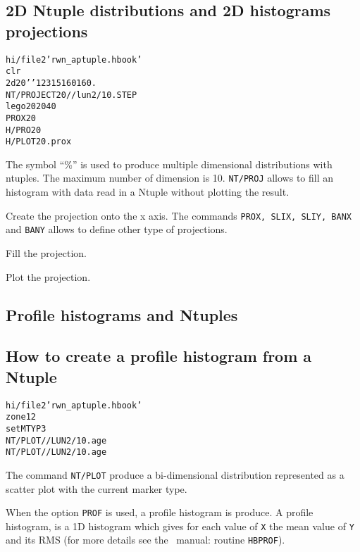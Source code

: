 \clearpage

\subsection{2D Ntuple distributions and 2D histograms projections}

\begin{alltt}
      hi/file 2 'rwn_aptuple.hbook'
      clr
      2d 20 ' ' 12 3 15 16 0 16 0.
     NT/PROJECT 20 //lun2/10.STEP%GRADE
      lego 20 20 40
     PROX 20
     H/PRO 20
     H/PLOT 20.prox
\end{alltt} 
\begin{DinglistE}
\item The symbol ``\%'' is used to produce multiple dimensional distributions
      with ntuples. The maximum number of dimension is 10. {\tt NT/PROJ} allows
      to fill an histogram with data read in a Ntuple without plotting the
      result.
\item Create the projection onto the x axis. The commands {\tt PROX, SLIX,
      SLIY, BANX} and {\tt BANY} allows to define other type of projections.
\item Fill the projection. 
\item Plot the projection. 
\end{DinglistE}

\clearpage

\subsection{Profile histograms and Ntuples}
\subsection*{How to create a profile histogram from a Ntuple}
\begin{alltt}
      hi/file 2 'rwn_aptuple.hbook'
      zone 1 2
      set MTYP 3
     NT/PLOT //LUN2/10.age%grade
     NT/PLOT //LUN2/10.age%grade option=prof
\end{alltt} 
\begin{DinglistE}
\item The command {\tt NT/PLOT} produce a bi-dimensional distribution
      represented as a scatter plot with the current marker type.
\item When the option {\tt PROF} is used, a profile histogram is produce.
      A profile histogram, is a 1D histogram which gives for each value
      of {\tt X} the mean value of {\tt Y} and its RMS (for more details
      see the \HBOOK\ manual: routine {\tt HBPROF}).
\end{DinglistE}

